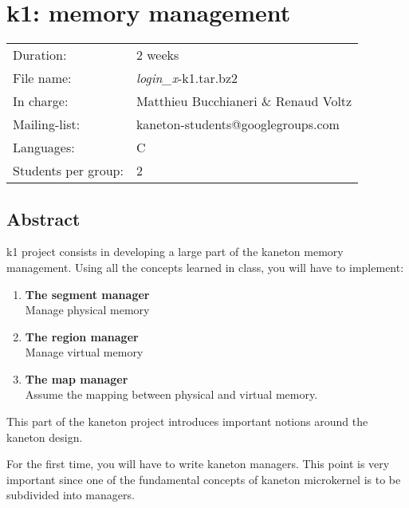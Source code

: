 
%
%

\chapter{k1: memory management}

%
%

\begin{tabular}{p{7cm}l}
Duration: & 2 weeks \\
File name: & {\em login\_x}-k1.tar.bz2 \\
In charge: & Matthieu Bucchianeri \& Renaud Voltz\\
Mailing-list: & kaneton-students@googlegroups.com \\
Languages: & C \\
Students per group: & 2 \\
\end{tabular}

\section{Abstract}

k1 project consists in developing a large part of the kaneton memory management. Using all the concepts learned in class, you will have to implement:

\begin{enumerate}
  \item
    {\bf The segment manager}\\
    Manage physical memory
  \item
    {\bf The region manager}\\
    Manage virtual memory
  \item
    {\bf The map manager}\\
    Assume the mapping between physical and virtual memory.\\
\end{enumerate}

This part of the kaneton project introduces important notions around the
kaneton design.

For the first time, you will have to write kaneton managers. This point is
very important since one of the fundamental concepts of kaneton microkernel
is to be subdivided into managers.

